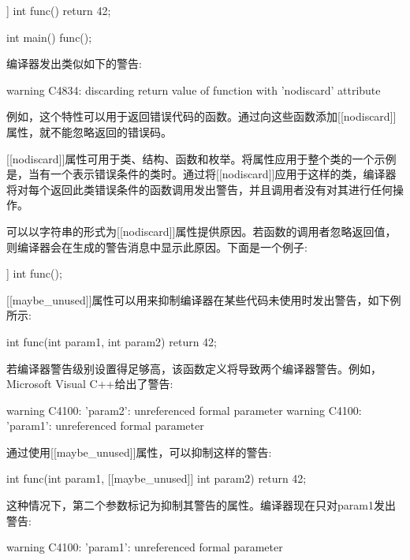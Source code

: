 \begin{cpp}
[[nodiscard]] int func() { return 42; }

int main()
{
    func();
}
\end{cpp}

编译器发出类似如下的警告:

\begin{shell}
warning C4834: discarding return value of function with 'nodiscard' attribute
\end{shell}

例如，这个特性可以用于返回错误代码的函数。通过向这些函数添加[[nodiscard]]属性，就不能忽略返回的错误码。

[[nodiscard]]属性可用于类、结构、函数和枚举。将属性应用于整个类的一个示例是，当有一个表示错误条件的类时。通过将[[nodiscard]]应用于这样的类，编译器将对每个返回此类错误条件的函数调用发出警告，并且调用者没有对其进行任何操作。

可以以字符串的形式为[[nodiscard]]属性提供原因。若函数的调用者忽略返回值，则编译器会在生成的警告消息中显示此原因。下面是一个例子:

\begin{cpp}
[[nodiscard("Some explanation")]] int func();
\end{cpp}


[[maybe\_unused]]属性可以用来抑制编译器在某些代码未使用时发出警告，如下例所示:

\begin{cpp}
int func(int param1, int param2)
{
    return 42;
}
\end{cpp}

若编译器警告级别设置得足够高，该函数定义将导致两个编译器警告。例如，Microsoft Visual C++给出了警告:

\begin{shell}
warning C4100: 'param2': unreferenced formal parameter
warning C4100: 'param1': unreferenced formal parameter
\end{shell}

通过使用[[maybe\_unused]]属性，可以抑制这样的警告:

\begin{cpp}
int func(int param1, [[maybe_unused]] int param2)
{
    return 42;
}
\end{cpp}

这种情况下，第二个参数标记为抑制其警告的属性。编译器现在只对param1发出警告:

\begin{shell}
warning C4100: 'param1': unreferenced formal parameter
\end{shell}

